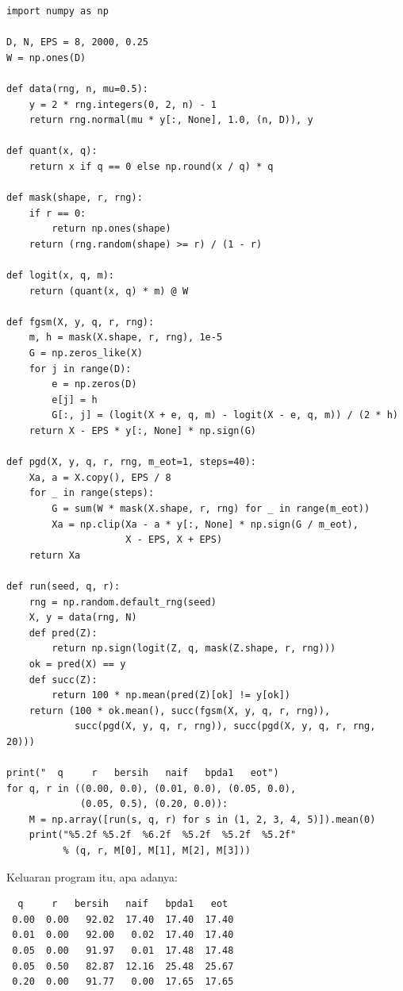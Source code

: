 \begin{lab}
\begin{verbatim}
import numpy as np

D, N, EPS = 8, 2000, 0.25
W = np.ones(D)

def data(rng, n, mu=0.5):
    y = 2 * rng.integers(0, 2, n) - 1
    return rng.normal(mu * y[:, None], 1.0, (n, D)), y

def quant(x, q):
    return x if q == 0 else np.round(x / q) * q

def mask(shape, r, rng):
    if r == 0:
        return np.ones(shape)
    return (rng.random(shape) >= r) / (1 - r)

def logit(x, q, m):
    return (quant(x, q) * m) @ W

def fgsm(X, y, q, r, rng):
    m, h = mask(X.shape, r, rng), 1e-5
    G = np.zeros_like(X)
    for j in range(D):
        e = np.zeros(D)
        e[j] = h
        G[:, j] = (logit(X + e, q, m) - logit(X - e, q, m)) / (2 * h)
    return X - EPS * y[:, None] * np.sign(G)

def pgd(X, y, q, r, rng, m_eot=1, steps=40):
    Xa, a = X.copy(), EPS / 8
    for _ in range(steps):
        G = sum(W * mask(X.shape, r, rng) for _ in range(m_eot))
        Xa = np.clip(Xa - a * y[:, None] * np.sign(G / m_eot),
                     X - EPS, X + EPS)
    return Xa

def run(seed, q, r):
    rng = np.random.default_rng(seed)
    X, y = data(rng, N)
    def pred(Z):
        return np.sign(logit(Z, q, mask(Z.shape, r, rng)))
    ok = pred(X) == y
    def succ(Z):
        return 100 * np.mean(pred(Z)[ok] != y[ok])
    return (100 * ok.mean(), succ(fgsm(X, y, q, r, rng)),
            succ(pgd(X, y, q, r, rng)), succ(pgd(X, y, q, r, rng, 20)))

print("  q     r   bersih   naif   bpda1   eot")
for q, r in ((0.00, 0.0), (0.01, 0.0), (0.05, 0.0),
             (0.05, 0.5), (0.20, 0.0)):
    M = np.array([run(s, q, r) for s in (1, 2, 3, 4, 5)]).mean(0)
    print("%5.2f %5.2f  %6.2f  %5.2f  %5.2f  %5.2f"
          % (q, r, M[0], M[1], M[2], M[3]))
\end{verbatim}

Keluaran program itu, apa adanya:

\begin{verbatim}
  q     r   bersih   naif   bpda1   eot
 0.00  0.00   92.02  17.40  17.40  17.40
 0.01  0.00   92.00   0.02  17.40  17.40
 0.05  0.00   91.97   0.01  17.48  17.48
 0.05  0.50   82.87  12.16  25.48  25.67
 0.20  0.00   91.77   0.00  17.65  17.65
\end{verbatim}
\end{lab}

